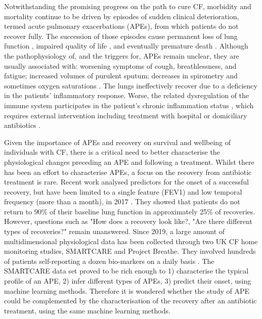Notwithstanding the promising progress on the path to cure CF, morbidity and mortality continue to be driven by episodes of sudden clinical deterioration, termed acute pulmonary exacerbations (APEs), from which patients do not recover fully. The succession of those episodes cause permanent loss of lung function \cite{sanders_2010}, impaired quality of life \cite{britto_2002}, and eventually premature death \cite{liou_2001}. Although the pathophysiology of, and the triggers for, APEs remain unclear, they are usually associated with: worsening symptoms of cough, breathlessness, and fatigue; increased volumes of purulent sputum; decreases in spirometry and sometimes oxygen saturations \cite{bilton_2011}. The lungs ineffectively recover due to a deficiency in the patients’ inflammatory response. Worse, the related dysregulation of the immune system participates in the patient's chronic inflammation status \cite{cantin_2015}, which requires external intervention including treatment with hospital or domiciliary antibiotics \cite{smith_2011}.

Given the importance of APEs and recovery on survival and wellbeing of individuals with CF, there is a critical need to better characterise the physiological changes preceding an APE and following a treatment. Whilst there has been an effort to characterise APEs, a focus on the recovery from antibiotic treatment is rare. Recent work analysed predictors for the onset of a successful recovery, but have been limited to a single feature (FEV1) and low temporal frequency (more than a month), in 2017 \cite{morgan_2017}\cite{sanders_2017}. They showed that patients do not return to 90\% of their baseline lung function in approximately 25\% of recoveries. However, questions such as "How does a recovery look like?, "Are there different types of recoveries?" remain unanswered. Since 2019, a large amount of multidimensional physiological data has been collected through two UK CF home monitoring studies, SMARTCARE and Project Breathe. They involved hundreds of patients self-reporting a dozen bio-markers on a daily basis \cite{damian}. The SMARTCARE data set proved to be rich enough to 1) characterise the typical profile of an APE, 2) infer different types of APEs, 3) predict their onset, using machine learning methods. Therefore it is wondered whether the study of APE could be complemented by the characterisation of the recovery after an antibiotic treatment, using the same machine learning methods.


